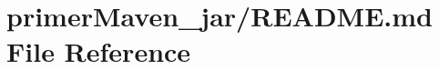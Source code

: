 \hypertarget{primer_maven__jar_2_r_e_a_d_m_e_8md}{}\section{primer\+Maven\+\_\+jar/\+R\+E\+A\+D\+ME.md File Reference}
\label{primer_maven__jar_2_r_e_a_d_m_e_8md}

